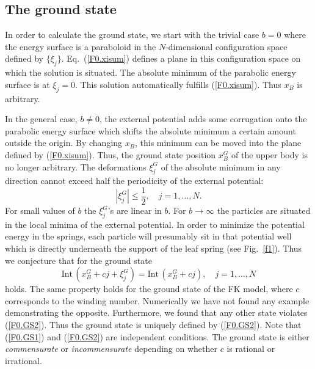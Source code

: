 \subsection{\protect\label{F01}The ground state}

In order to calculate the ground state, we start with the trivial
case $b=0$ where the energy surface is a paraboloid in the
$N$-dimensional configuration space defined by $\{\xi_j\}$.
Eq.~(\ref{F0.xisum}) defines a plane in this configuration space on
which the solution is situated. The absolute minimum of the parabolic
energy surface is at $\xi_j=0$. This solution automatically fulfills
(\ref{F0.xisum}).  Thus $x_B$ is arbitrary.

In the general case, $b\not=0$, the external potential adds some
corrugation onto the parabolic energy surface which shifts the
absolute minimum a certain amount outside the origin. By changing
$x_B$, this minimum can be moved into the plane defined by
(\ref{F0.xisum}). Thus, the ground state position $x_B^G$ of the
upper body is no longer arbitrary. The deformations $\xi_j^G$ of the
absolute minimum in any direction cannot exceed half the periodicity
of the external potential:
\begin{equation}
  |\xi_j^G|\le \frac{1}{2},\quad j=1,\ldots,N.
  \label{F0.GS1}
\end{equation}
For small values of $b$ the $\xi_j^G$'s are linear in $b$. For
$b\to\infty$ the particles are situated in the local minima of the
external potential. In order to minimize the potential energy in the
springs, each particle will presumably sit in that potential well
which is directly underneath the support of the leaf spring (see
Fig.~\ref{f1}). Thus we conjecture that for the ground state
\begin{equation}
  \mbox{Int}\,(x_B^G+cj+\xi_j^G)=\mbox{Int}\,(x_B^G+cj),\quad 
   j=1,\ldots,N
  \label{F0.GS2}
\end{equation}
holds. The same property holds for the ground state of the FK
model\cite{aub.78}, where $c$ corresponds to the winding number.
Numerically we have not found any example demonstrating the opposite.
Furthermore, we found that any other state violates (\ref{F0.GS2}).
Thus the ground state is uniquely defined by (\ref{F0.GS2}). Note
that (\ref{F0.GS1}) and (\ref{F0.GS2}) are independent conditions.
The ground state is either {\em commensurate\/} or {\em
incommensurate\/} depending on whether $c$ is rational or irrational.

